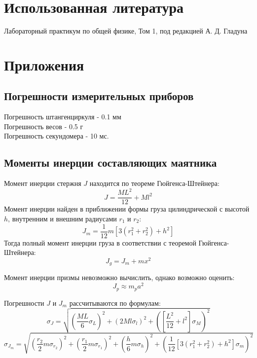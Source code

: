 \documentclass[12pt]{article}
\begin{document}
\section{Использованная литература}
\begin{thebibliography}{9}
    Лабораторный практикум по общей физике, Том 1, под редакцией А. Д. Гладуна
\end{thebibliography}

\section{Приложения}
\subsection{Погрешности измерительных приборов} \label{sec:app_1}
Погрешность штангенциркуля - 0.1 мм\\
Погрешность весов - 0.5 г\\
Погрешность секундомера - 10 мс.

\subsection{Моменты инерции составляющих маятника} \label{sec:app_2}
Момент инерции стержня $J$ находится по теореме Гюйгенса-Штейнера:
\begin{equation}\label{eq:5}
    J = \frac{ML^2}{12} + Ml^2
\end{equation}
Момент инерции найден в приближении формы груза цилиндрической с высотой $h$, внутренним и внешним радиусами $r_1$ и $r_2$:
$$J_m = \frac{1}{12}m[3(r_1^2 + r_2^2) + h^2]$$
Тогда полный момент инерции груза в соответствии с теоремой Гюйгенса-Штейнера:
\begin{equation}\label{eq:6}
    J_g = J_m + mx^2
\end{equation}

Момент инерции призмы невозможно вычислить, однако возможно оценить:
\begin{equation}\label{eq:7}
    J_p \approx {m_p}a^2
\end{equation}

Погрешности $J$ и $J_m$ рассчитываются по формулам:
\begin{equation}\label{eq:9}
    \sigma_J = \sqrt{(\frac{ML}{6}\sigma_L)^2 + (2Ml\sigma_l)^2 + ([\frac{L^2}{12} + l^2]\sigma_M)^2}
\end{equation}
\begin{equation}\label{eq:10}
    \sigma_{J_m} = \sqrt{(\frac{r_2}{2}m\sigma_{r_2})^2 + (\frac{r_1}{2}m\sigma_{r_1})^2 +
        (\frac{h}{6}m\sigma_h)^2 + (\frac{1}{12}[3(r_1^2 + r_2^2) + h^2]\sigma_m)^2}
\end{equation}
\end{document}

